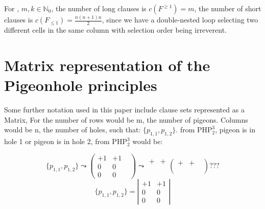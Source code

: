 \documentclass{report}
\newcommand{\set}[1]{\{ #1 \}}
\newcommand{\NN}{\mathbb{N}}
\newcommand{\NNZ}{\NN_0}
\newcommand{\php}{\mathrm{PHP}}
\begin{document}
For \bmm{\php^m_k}, $m, k \in \NNZ$, the number of long clauses is $c(F^{\ge 1}) = m$, the number of short clauses is $c(F_{\le 1}) = \frac {n(n+1)n}{2}$, since we have a double-nested loop selecting two different cells in the same column with selection order being irreverent. 


\section{Matrix representation of the Pigeonhole principles}
\label{sec:phpMatrix}

Some further notation used in this paper include clause sets represented as a Matrix,
For \bmm{\php^m_k} the number of rows would be m, the number of pigeons.
Columns would be n, the number of holes, such that: $\set{p_{1,1},p_{1,2}}.$ from $\php^3_2$,  pigeon is in hole 1 or pigeon is in hole 2, from $\php^3_2$ would be:

\begin{displaymath}
  \set{p_{1,1},p_{1,2}} \leadsto
  \begin{pmatrix}
    +1 & +1\\
    0 & 0 &\\
    0 & 0
  \end{pmatrix} \leadsto
  \begin{array}{cc}
    + & +\\
    \\
    \\
  \end{array}
  \begin{pmatrix}
    + & +&\\
     &  &\\
     &  &
  \end{pmatrix} ???
\end{displaymath}
\[ \set{p_{1,1},p_{1,2}} = \left| \begin{array}{ccc}
+1 & +1 \\
 0 & 0 \\
 0 & 0 \end{array} \right| \] 
 
\end{document}
